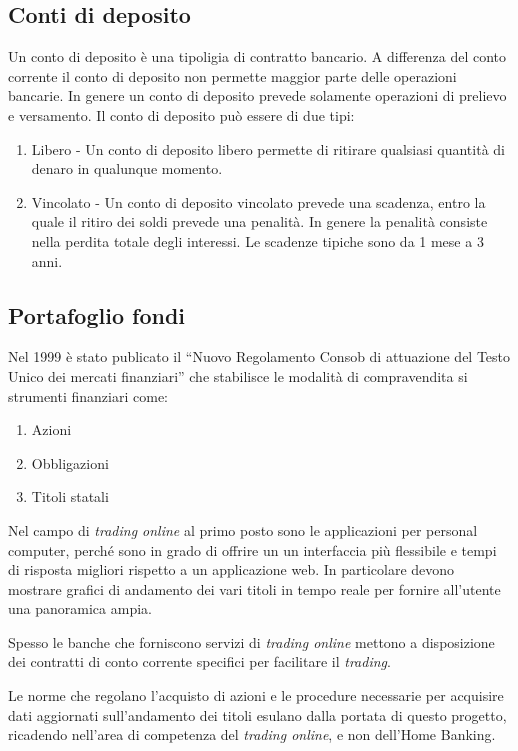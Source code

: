 \documentclass[10pt]{softeng} %
\begin{document}
\subsection{Conti di deposito}

Un conto di deposito \`e una tipoligia di contratto bancario.
A differenza del conto corrente il conto di deposito non permette maggior parte delle operazioni bancarie.
In genere un conto di deposito prevede solamente operazioni di prelievo e versamento.
Il conto di deposito pu\`o essere di due tipi:
\begin{enumerate}
    \item Libero - Un conto di deposito libero permette di ritirare qualsiasi quantit\`a di denaro in qualunque momento.
    \item Vincolato - Un conto di deposito vincolato prevede una scadenza, entro la quale il ritiro dei soldi prevede una penalit\`a. In genere la penalit\`a consiste nella perdita totale degli interessi. Le scadenze tipiche sono da 1 mese a 3 anni.
\end{enumerate}


\subsection{Portafoglio fondi}

Nel 1999 \`e stato publicato il ``Nuovo Regolamento Consob di attuazione del Testo Unico dei mercati finanziari'' che stabilisce le modalit\`a di compravendita si strumenti finanziari come:
\begin{enumerate}
    \item Azioni
    \item Obbligazioni
    \item Titoli statali
\end{enumerate}

Nel campo di \emph{trading online} al primo posto sono le applicazioni per personal computer, perch\'e sono in grado di offrire un un interfaccia pi\`u flessibile e tempi di risposta migliori rispetto a un applicazione web.
In particolare devono mostrare grafici di andamento dei vari titoli in tempo reale per fornire all'utente una panoramica ampia.

Spesso le banche che forniscono servizi di \emph{trading online} mettono a disposizione dei contratti di conto corrente specifici per facilitare il \emph{trading}.

Le norme che regolano l'acquisto di azioni e le procedure necessarie per acquisire dati aggiornati sull'andamento dei titoli esulano dalla portata di questo progetto, ricadendo nell'area di competenza del \emph{trading online}, e non dell'Home Banking.
\end{document}
